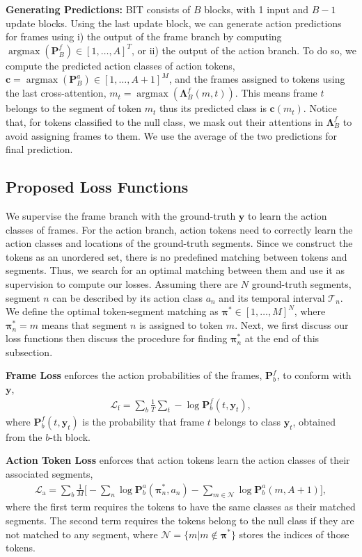 \documentclass[10pt,twocolumn,letterpaper]{article}
\newcommand{\headline}[1]{\noindent \textbf{#1}}
\newcommand{\Prob}{\mathbf{P}}
\newcommand{\mL}{\mathcal{L}}
\newcommand{\y}{\boldsymbol{y}}
\renewcommand{\c}{\boldsymbol{c}}
\newcommand{\LM}{\mathbf{\Lambda}}
\newcommand{\0}{\boldsymbol{0}}
\newcommand{\amax}{\operatorname{argmax}}
\newcommand{\bpi}{\boldsymbol{\pi}}
\begin{document}
\headline{Generating Predictions: }
BIT consists of $B$ blocks, with 1 input and $B-1$ update blocks. Using the last update block, we can generate action predictions for frames using i) the output of the frame branch by computing $\amax(\Prob^f_B) \in [1, \ldots, A]^T$, or ii) the output of the action branch. 
To do so, we compute the predicted action classes of action tokens, $\c = \amax(\Prob^a_B) \in [1, \ldots, A+1]^M$, and the frames assigned to tokens  using the last cross-attention, $m_t = \amax(\LM^f_B(m, t))$. This means frame $t$ belongs to the segment of token $m_t$ thus its predicted class is $\c(m_t)$.
Notice that, for tokens classified to the null class, we mask out their attentions in $\LM^f_B$ to avoid assigning frames to them. 
We use the average of the two predictions for final prediction.





\subsection{Proposed Loss Functions}
\label{sec:loss}

We supervise the frame branch with the ground-truth $\y$ to learn the action classes of frames. 
For the action branch, action tokens need to correctly learn the action classes and locations of the ground-truth segments. 
Since we construct the tokens as an unordered set, there is no predefined matching between tokens and segments. Thus, we search for an optimal matching between them and use it as supervision to compute our losses.  
Assuming there are $N$ ground-truth segments, segment $n$ can be described by its action class $a_n$ and its temporal interval $\mathcal{T}_n$. 
We define the optimal token-segment matching as $\bpi^* \in [1, \ldots, M ] ^N$, where $\bpi^*_n = m$ means that segment $n$ is assigned to token $m$. Next, we first discuss our loss functions then discuss the procedure for finding $\bpi^*_n$ at the end of this subsection. 



\headline{Frame Loss} enforces the action probabilities of the frames, $\Prob^f_b$, to conform with $\y$,
\begin{align}
    \mL_\text{f} = \sum_{b} \frac{1}{T}\sum_{t} - \log \Prob^f_b(t, \y_t),
\end{align}
where $\Prob^f_b(t, \y_t)$ is the probability that frame $t$ belongs to class $\y_t$, obtained from the $b$-th block.


\headline{Action Token Loss} enforces that action tokens learn the action classes of their associated segments,
\begin{align}
   \mL_\text{a} = \sum_{b} \frac{1}{M}\Big[ - \sum_{n} \log \Prob^a_b(\bpi^{*}_n, a_n) - \sum_{m \in \mathcal{N}} \log \Prob^a_b(m, A+1) \Big],
\end{align}
where the first term requires the tokens to have the same classes as their matched segments. The second term requires the tokens belong to the null class if they are not matched to any segment, where $\mathcal{N} = \{m | m \notin \bpi^*\}$ stores the indices of those tokens.
\end{document}
